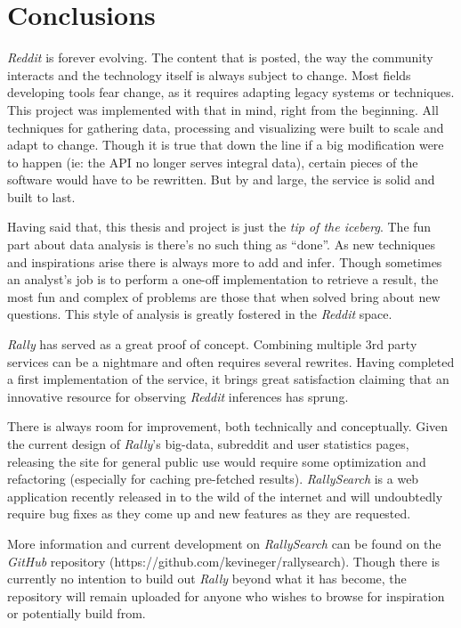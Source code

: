\documentclass[msc,oneside]{ubcthesis}%
\begin{document}
\chapter{Conclusions}
\textit{Reddit} is forever evolving. The content that is posted, the way the community interacts and the technology itself is always subject to change. Most fields developing tools fear change, as it requires adapting legacy systems or techniques. This project was implemented with that in mind, right from the beginning. All techniques for gathering data, processing and visualizing were built to scale and adapt to change. Though it is true that down the line if a big modification were to happen (ie: the API no longer serves integral data), certain pieces of the software would have to be rewritten. But by and large, the service is solid and built to last.
\par
Having said that, this thesis and project is just the \textit{tip of the iceberg}. The fun part about data analysis is there's no such thing as ``done''. As new techniques and inspirations arise there is always more to add and infer. Though sometimes an analyst's job is to perform a one-off implementation to retrieve a result, the most fun and complex of problems are those that when solved bring about new questions. This style of analysis is greatly fostered in the \textit{Reddit} space.
\par
\textit{Rally} has served as a great proof of concept. Combining multiple 3rd party services can be a nightmare and often requires several rewrites. Having completed a first implementation of the service, it brings great satisfaction claiming that an innovative resource for observing \textit{Reddit} inferences has sprung.
\par
There is always room for improvement, both technically and conceptually. Given the current design of \textit{Rally}'s big-data, subreddit and user statistics pages, releasing the site for general public use would require some optimization and refactoring (especially for caching pre-fetched results). \textit{RallySearch} is a web application recently released in to the wild of the internet and will undoubtedly require bug fixes as they come up and new features as they are requested.
\par
More information and current development on \textit{RallySearch} can be found on the \textit{GitHub} repository (https://github.com/kevineger/rallysearch). Though there is currently no intention to build out \textit{Rally} beyond what it has become, the repository will remain uploaded for anyone who wishes to browse for inspiration or potentially build from.

\end{document}
